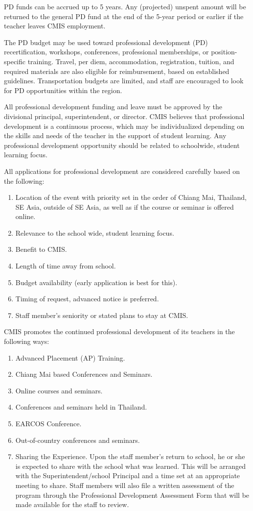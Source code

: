 \documentclass{report}
\begin{document}
PD funds can be accrued up to 5 years. Any (projected) unspent amount will be returned to the general PD fund at the end of the 5-year period or earlier if the teacher leaves CMIS employment.

The PD budget may be used toward professional development (PD) recertification, workshops, conferences, professional memberships, or position-specific training.   Travel, per diem, accommodation, registration, tuition, and required materials are also eligible for reimbursement, based on established guidelines.  Transportation budgets are limited, and staff are encouraged to look for PD opportunities within the region.  

All professional development funding and leave must be approved by the divisional principal, superintendent, or director.  CMIS believes that professional development is a continuous process, which may be individualized depending on the skills and needs of the teacher in the support of student learning. Any professional development opportunity should be related to schoolwide, student learning focus. 

All applications for professional development are considered carefully based on the following:
\begin{enumerate}
\item Location of the event with priority set in the order of Chiang Mai, Thailand, SE Asia, outside of SE Asia, as well as if the course or seminar is offered online.
\item Relevance to the school wide, student learning focus.
\item Benefit to CMIS.
\item Length of time away from school.
\item Budget availability (early application is best for this).
\item Timing of request, advanced notice is preferred.
\item Staff member’s seniority or stated plans to stay at CMIS.
\end{enumerate}
	
CMIS promotes the continued professional development of its teachers in the following ways:


\begin{enumerate}
\item Advanced Placement (AP) Training.  
\item Chiang Mai based Conferences and Seminars. 
\item Online courses and seminars.  
\item Conferences and seminars held in Thailand. 
\item EARCOS Conference.
\item Out-of-country conferences and seminars. 
\item Sharing the Experience.  Upon the staff member’s return to school, he or she is expected to share with the school what was learned.  This will be arranged with the Superintendent/school Principal and a time set at an appropriate meeting to share.  Staff members will also file a written assessment of the program through the Professional Development Assessment Form that will be made available for the staff to review.
\end{enumerate}
\end{document}
